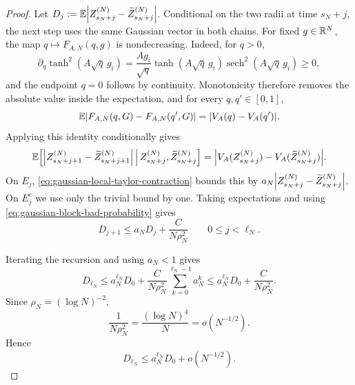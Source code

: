 \documentclass[11pt,reqno,a4paper]{article}
\newcommand{\Ee}{\E}
\begin{document}
\begin{proof}
  Let
  $
    D_j:=
    \Ee\abs{
      Z_{s_N+j}^{(N)}
      -
      \widetilde Z_{s_N+j}^{(N)}
    }
  $.
  Conditional on the two radii at time $s_N+j$, the next step uses the same
  Gaussian vector in both chains. For fixed $g\in\mathbb{R}^N$, the map
  $q\mapsto F_{A,N}(q,g)$ is nondecreasing. Indeed, for $q>0$,
  \begin{equation*}
    \partial_q\tanh^2(A\sqrt q\,g_i)
    =
    \frac{Ag_i}{\sqrt q}
    \tanh(A\sqrt q\,g_i)
    \operatorname{sech}^2(A\sqrt q\,g_i)
    \geq0,
  \end{equation*}
  and the endpoint $q=0$ follows by continuity. Monotonicity therefore
  removes the absolute value inside the expectation, and for every
  $q,q'\in[0,1]$,
  \begin{equation*}
    \Ee\abs{F_{A,N}(q,G)-F_{A,N}(q',G)}
    =
    \abs{V_A(q)-V_A(q')}.
  \end{equation*}
  Applying this identity conditionally gives
  \begin{align*}
    \Ee\left[
      \abs{
        Z_{s_N+j+1}^{(N)}
        -
        \widetilde Z_{s_N+j+1}^{(N)}
      }
      \,\middle|\, Z_{s_N+j}^{(N)},\widetilde Z_{s_N+j}^{(N)}
    \right]
    =
    \abs{
      V_A(Z_{s_N+j}^{(N)})
      -
      V_A(\widetilde Z_{s_N+j}^{(N)})
    }.
  \end{align*}
  On $E_j$, \cref{eq:gaussian-local-taylor-contraction} bounds this
  by
  $a_N\abs{Z_{s_N+j}^{(N)}-\widetilde Z_{s_N+j}^{(N)}}$. On
  $E_j^c$ we use only the trivial bound by one. Taking expectations
  and using \cref{eq:gaussian-block-bad-probability} gives
  \begin{equation}\label{eq:gaussian-block-recursion}
    D_{j+1}
    \leq
    a_ND_j
    +
    \frac{C}{N \rho_N^2}
    \qquad
    0\leq j<\ell_N .
  \end{equation}

  Iterating the recursion and using $a_N<1$ gives
  \begin{equation*}
    D_{\ell_N}
    \leq
    a_N^{\ell_N}D_0
    +
    \frac{C}{N \rho_N^2}
    \sum_{k=0}^{\ell_N-1}a_N^k
    \leq
    a_N^{\ell_N}D_0
    +
    \frac{C}{N \rho_N^2}.
  \end{equation*}
  Since $\rho_N=(\log N)^{-2}$,
  \begin{equation*}
    \frac{1}{N \rho_N^2}
    =
    \frac{(\log N)^4}{N}
    =
    o(N^{-1/2}).
  \end{equation*}
  Hence
  \begin{equation}\label{eq:gaussian-block-iterated}
    D_{\ell_N}
    \leq
    a_N^{\ell_N}D_0
    +
    o(N^{-1/2}).
  \end{equation}


\end{proof}
\end{document}
